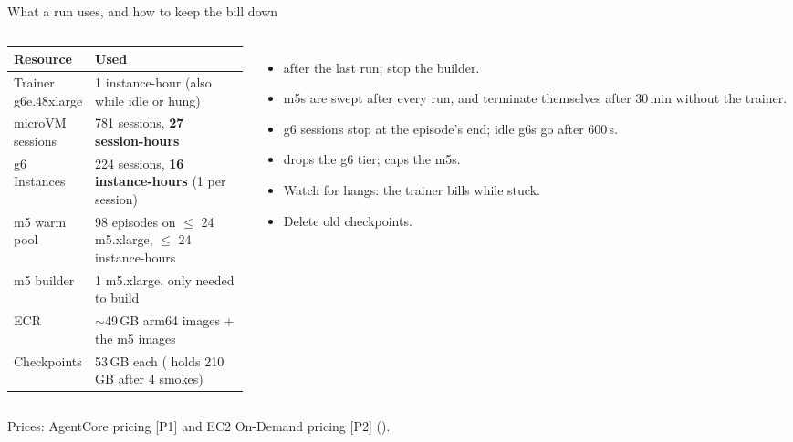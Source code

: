 \begin{frame}{What a run uses, and how to keep the bill down}
\begin{columns}[T]
\scriptsize\setlength{\tabcolsep}{3pt}
\begin{tabularx}{\linewidth}{@{}P{0.30\linewidth}Y@{}}
\toprule
\textbf{Resource} & \textbf{Used}\\
\midrule
Trainer g6e.48xlarge & 1 instance-hour (also while idle or hung)\\
\textcolor{cat2}{microVM} sessions & 781 sessions, \textbf{27 session-hours}\\
\textcolor{cat3}{g6} Instances & 224 sessions, \textbf{16 instance-hours} (1 per session)\\
\textcolor{cat1}{m5} warm pool & 98 episodes on $\le$ 24 m5.xlarge, $\le$ 24 instance-hours\\
m5 builder & 1 m5.xlarge, only needed to build\\
ECR & $\sim$49\,GB arm64 images + the m5 images\\
Checkpoints & 53\,GB each ( holds 210\,GB after 4 smokes)\\
\bottomrule
\end{tabularx}
\begin{itemize}\scriptsize\setlength{\itemsep}{0.7mm}
\item {} after the last run; stop the builder.
\item m5s are swept after every run, and terminate themselves after 30\,min without the trainer.
\item g6 sessions stop at the episode's end; idle g6s go after 600\,s.
\item {} drops the g6 tier;  caps the m5s.
\item Watch for hangs: the trainer bills while stuck.
\item Delete old checkpoints.
\end{itemize}
\end{columns}
\par\vspace{1mm}
{\scriptsize Prices: AgentCore pricing [P1] and EC2 On-Demand pricing [P2] ().}
\end{frame}

